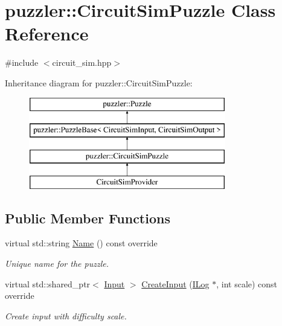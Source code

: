 \hypertarget{a00006}{}\section{puzzler\+:\+:Circuit\+Sim\+Puzzle Class Reference}
\label{a00006}


{\ttfamily \#include $<$circuit\+\_\+sim.\+hpp$>$}

Inheritance diagram for puzzler\+:\+:Circuit\+Sim\+Puzzle\+:\begin{figure}[H]
\begin{center}
\leavevmode
\includegraphics[height=4.000000cm]{a00006}
\end{center}
\end{figure}
\subsection*{Public Member Functions}
\begin{DoxyCompactItemize}
\item 
virtual std\+::string \hyperlink{a00006_a566e51a147dd0d1ed8dfca4f4649e4b1}{Name} () const override
\begin{DoxyCompactList}\small\item\em Unique name for the puzzle. \end{DoxyCompactList}\item 
virtual std\+::shared\+\_\+ptr$<$ \hyperlink{a00009}{Input} $>$ \hyperlink{a00006_a35c646b7f525a92697fdacbdc3f4c556}{Create\+Input} (\hyperlink{a00008}{I\+Log} $\ast$, int scale) const override
\begin{DoxyCompactList}\small\item\em Create input with difficulty scale. \end{DoxyCompactList}\end{DoxyCompactItemize}
